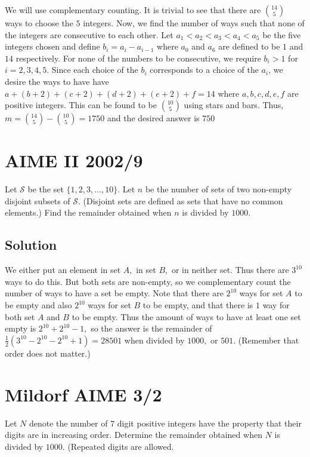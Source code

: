 \documentclass{article}
\begin{document}
We will use complementary counting. It is trivial to see that there are $\binom{14}{5}$ ways to choose the $5$ integers. Now, we find the number of ways such that none of the integers are consecutive to each other. Let $a_1< a_2< a_3<a_4<a_5$ be the five integers chosen and define $b_i = a_i - a_{i-1}$ where $a_0$ and $a_6$ are defined to be $1$ and $14$ respectively. For none of the numbers to be consecutive, we require $b_i>1$ for $i = 2,3,4,5$. Since each choice of the $b_i$ corresponds to a choice of the $a_i$, we desire the ways to have have $a + (b+2) + (c+2) + (d+2) + (e+2) + f= 14$ where $a,b,c,d,e,f$ are positive integers. This can be found to be $\binom{10}{5}$ using stars and bars. Thus, $m= \binom{14}{5} - \binom{10}{5} = 1750$ and the desired answer is $\boxed{750}$

\pagebreak\section{AIME II 2002/9}
Let $\mathcal{S}$ be the set $\lbrace1,2,3,\ldots,10\rbrace.$ Let $n$ be the number of sets of two non-empty disjoint subsets of $\mathcal{S}$. (Disjoint sets are defined as sets that have no common elements.) Find the remainder obtained when $n$ is divided by $1000$.

\subsection{Solution}
We either put an element in set $A,$ in set $B,$ or in neither set. Thus there are $3^{10}$ ways to do this. But both sets are non-empty, so we complementary count the number of ways to have a set be empty. Note that there are $2^{10}$ ways for set $A$ to be empty and also $2^{10}$ ways for set $B$ to be empty, and that there is $1$ way for both set $A$ and $B$ to be empty. Thus the amount of ways to have at least one set empty is $2^{10}+2^{10}-1,$ so the answer is the remainder of $\frac{1}{2}(3^{10}-2^{10}-2^{10}+1)=28501$ when divided by $1000,$ or $501.$ (Remember that order does not matter.)

\pagebreak\section{Mildorf AIME 3/2}
Let $N$ denote the number of $7$ digit positive integers have the property that their digits are in increasing order. Determine the remainder obtained when $N$ is divided by $1000$. (Repeated digits are allowed.
\end{document}
